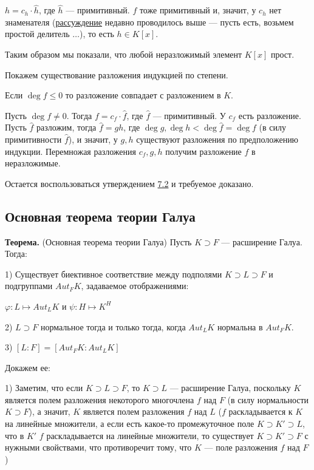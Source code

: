 \documentclass[../main.tex]{subfiles}
\begin{document}
    $h = c_h \cdot \hat{h}$, где $\hat{h}$ --- примитивный. $f$ тоже примитивный
    и, значит, у $c_h$ нет знаменателя
    (\hyperlink{9.3.no.denominator}{рассуждение} недавно проводилось выше ---
    пусть есть, возьмем простой делитель $\ldots$), то есть $h \in K[x]$.

    Таким образом мы показали, что любой неразложимый элемент $K[x]$ прост.

    Покажем существование разложения индукцией по степени.

    Если $\deg f \leqslant 0$ то разложение совпадает с разложением в $K$.

    Пусть $\deg f \ne 0$. Тогда $f = c_f \cdot \hat{f}$,
    где $\hat{f}$ --- примитивный. У $c_f$ есть разложение. Пусть
    $\hat{f}$ разложим, тогда $\hat{f} = gh$, где $\deg g, \deg h
    < \deg \hat{f} = \deg f$ (в силу примитивности $\hat{f}$), и значит,
    у $g, h$ существуют разложения по предположению индукции.
    Перемножая разложения $c_f, g, h$ получим разложение $f$ в неразложимые.

    Остается воспользоваться утверждением \hyperlink{7.2}{7.2} и
    требуемое доказано.

\hypertarget{9.4}{\subsection{Основная теорема теории Галуа}}
    \textbf{Теорема.} (Основная теорема теории Галуа)
    Пусть $K \supset F$ --- расширение Галуа. Тогда:

    1) Существует биективное соответствие между подполями
    $K \supset L \supset F$ и подгруппами $Aut_FK$, задаваемое отображениями:

    $\varphi: L \mapsto Aut_LK$ и $\psi: H \mapsto K^H$

    2) $L \supset F$ нормальное тогда и только тогда, когда $Aut_LK$ нормальна
    в $Aut_FK$.

    3) $[L : F] = [Aut_FK : Aut_LK]$

    Докажем ее:

    1) Заметим, что если $K \supset L \supset F$, то
    $K \supset L$ --- расширение Галуа, поскольку $K$ является
    полем разложения некоторого многочлена $f$ над $F$ (в силу нормальности
    $K \supset F$), а значит, $K$ является полем разложения $f$ над $L$ ($f$
    раскладывается к $K$ на линейные множители,
    а если есть какое-то промежуточное поле $K \supset K' \supset L$, что
    в $K'$ $f$ раскладывается на линейные множители, то существует
    $K \supset K' \supset F$ с нужными свойствами, что противоречит тому, что
    $K$ --- поле разложения $f$ над $F$)
\end{document}
